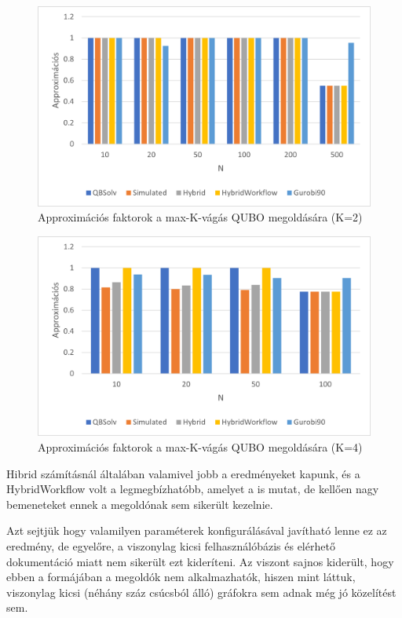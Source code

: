 \begin{figure}[!ht]
	\centering
	\includegraphics[width=150mm, keepaspectratio]{figures/diagrams/maxKCutQUBO_K2approx.png}
	\caption{Approximációs faktorok a max-K-vágás QUBO megoldására (K=2)}
	\label{fig:maxKCutQUBO_K2approx}
\end{figure}

\begin{figure}[!ht]
	\centering
	\includegraphics[width=150mm, keepaspectratio]{figures/diagrams/maxKCutQUBO_K4approx.png}
	\caption{Approximációs faktorok a max-K-vágás QUBO megoldására (K=4)}
	\label{fig:maxKCutQUBO_K4approx}
\end{figure}

Hibrid számításnál általában valamivel jobb a eredményeket kapunk, és a HybridWorkflow volt a legmegbízhatóbb, amelyet a  is mutat, de kellően nagy bemeneteket ennek a megoldónak sem sikerült kezelnie.

Azt sejtjük hogy valamilyen paraméterek konfigurálásával javítható lenne ez az eredmény, de egyelőre, a viszonylag kicsi felhasználóbázis és elérhető dokumentáció miatt nem sikerült ezt kideríteni. Az viszont sajnos kiderült, hogy ebben a formájában a megoldók nem alkalmazhatók, hiszen mint láttuk, viszonylag kicsi (néhány száz csúcsból álló) gráfokra sem adnak még jó közelítést sem.

